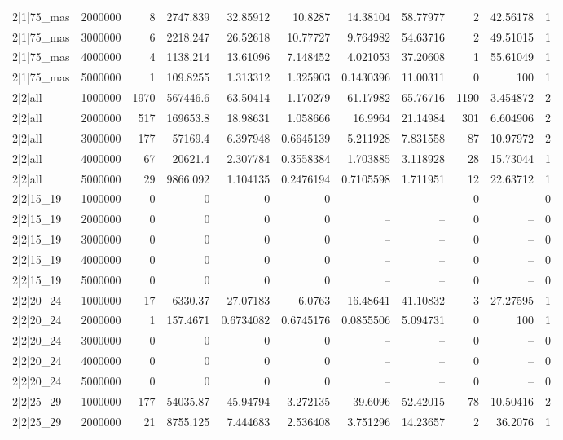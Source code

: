 \begin{tabular}{lrrrrrrrrrr}
2|1|75\_mas & 2000000 & 8 & 2747.839 & 32.85912 & 10.8287 & 14.38104 & 58.77977 & 2 & 42.56178 & 1 \\
2|1|75\_mas & 3000000 & 6 & 2218.247 & 26.52618 & 10.77727 & 9.764982 & 54.63716 & 2 & 49.51015 & 1 \\
2|1|75\_mas & 4000000 & 4 & 1138.214 & 13.61096 & 7.148452 & 4.021053 & 37.20608 & 1 & 55.61049 & 1 \\
2|1|75\_mas & 5000000 & 1 & 109.8255 & 1.313312 & 1.325903 & 0.1430396 & 11.00311 & 0 & 100 & 1 \\
2|2|all & 1000000 & 1970 & 567446.6 & 63.50414 & 1.170279 & 61.17982 & 65.76716 & 1190 & 3.454872 & 2 \\
2|2|all & 2000000 & 517 & 169653.8 & 18.98631 & 1.058666 & 16.9964 & 21.14984 & 301 & 6.604906 & 2 \\
2|2|all & 3000000 & 177 & 57169.4 & 6.397948 & 0.6645139 & 5.211928 & 7.831558 & 87 & 10.97972 & 2 \\
2|2|all & 4000000 & 67 & 20621.4 & 2.307784 & 0.3558384 & 1.703885 & 3.118928 & 28 & 15.73044 & 1 \\
2|2|all & 5000000 & 29 & 9866.092 & 1.104135 & 0.2476194 & 0.7105598 & 1.711951 & 12 & 22.63712 & 1 \\
2|2|15\_19 & 1000000 & 0 & 0 & 0 & 0 & -- & -- & 0 & -- & 0 \\
2|2|15\_19 & 2000000 & 0 & 0 & 0 & 0 & -- & -- & 0 & -- & 0 \\
2|2|15\_19 & 3000000 & 0 & 0 & 0 & 0 & -- & -- & 0 & -- & 0 \\
2|2|15\_19 & 4000000 & 0 & 0 & 0 & 0 & -- & -- & 0 & -- & 0 \\
2|2|15\_19 & 5000000 & 0 & 0 & 0 & 0 & -- & -- & 0 & -- & 0 \\
2|2|20\_24 & 1000000 & 17 & 6330.37 & 27.07183 & 6.0763 & 16.48641 & 41.10832 & 3 & 27.27595 & 1 \\
2|2|20\_24 & 2000000 & 1 & 157.4671 & 0.6734082 & 0.6745176 & 0.0855506 & 5.094731 & 0 & 100 & 1 \\
2|2|20\_24 & 3000000 & 0 & 0 & 0 & 0 & -- & -- & 0 & -- & 0 \\
2|2|20\_24 & 4000000 & 0 & 0 & 0 & 0 & -- & -- & 0 & -- & 0 \\
2|2|20\_24 & 5000000 & 0 & 0 & 0 & 0 & -- & -- & 0 & -- & 0 \\
2|2|25\_29 & 1000000 & 177 & 54035.87 & 45.94794 & 3.272135 & 39.6096 & 52.42015 & 78 & 10.50416 & 2 \\
2|2|25\_29 & 2000000 & 21 & 8755.125 & 7.444683 & 2.536408 & 3.751296 & 14.23657 & 2 & 36.2076 & 1 \\

\end{tabular}

